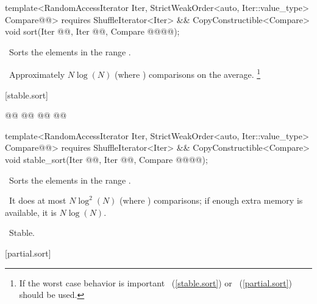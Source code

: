 \documentclass[american,twoside]{book}
\begin{document}
\begin{paras}
\begin{itemdecl}
template<RandomAccessIterator Iter, 
         StrictWeakOrder<auto, Iter::value_type> Compare@@>
  requires ShuffleIterator<Iter>
        && CopyConstructible<Compare>
  void sort(Iter @@, Iter @@,
            Compare @@@@);
\end{itemdecl}

\begin{itemdescr}
\pnum
\effects\ 
Sorts the elements in the range
.

\pnum
\complexity\ 
Approximately $N \log(N)$
(where
)
comparisons on the average.%
\footnote{
If the worst case behavior is important
~(\ref{stable.sort}) or
\tcode{partial_sort()}~(\ref{partial.sort}) should be used.
}
\end{itemdescr}

[stable.sort]{}

%
\begin{itemdecl}
@@
  @@
        @@
  @@

template<RandomAccessIterator Iter, 
         StrictWeakOrder<auto, Iter::value_type> Compare@@>
  requires ShuffleIterator<Iter>
        && CopyConstructible<Compare>
  void stable_sort(Iter @@, Iter @@,
                   Compare @@@@);
\end{itemdecl}

\begin{itemdescr}
\pnum
\effects\ 
Sorts the elements in the range .

\pnum
\complexity\ 
It does at most $N \log^2(N)$
(where
)
comparisons; if enough extra memory is available, it is
$N \log(N)$.

\pnum
\notes\ 
Stable.
\end{itemdescr}

[partial.sort]{}


\end{paras}
\end{document}
